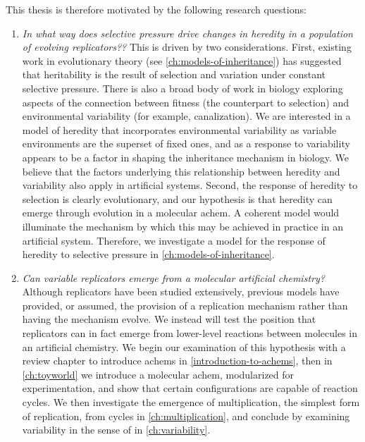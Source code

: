 This thesis is therefore motivated by the following research questions:

\begin{enumerate}[label=RQ\arabic*:]
	
	\item \emph{In what way does selective pressure drive changes in heredity in a population of evolving replicators??} This is driven by two considerations. First, existing work in evolutionary theory (see \cref{ch:models-of-inheritance}) has suggested that heritability is the result of selection and variation under constant selective pressure. There is also a broad body of work in biology exploring aspects of the connection between fitness (the counterpart to selection) and environmental variability (for example, canalization). We are interested in a model of heredity that incorporates environmental variability as variable environments are the superset of fixed ones, and as a response to variability appears to be a factor in shaping the inheritance mechanism in biology. We believe that the factors underlying this relationship between heredity and variability also apply in artificial systems. Second, the response of heredity to selection is clearly evolutionary, and our hypothesis is that heredity can emerge through evolution in a molecular \gls{achem}. A coherent model would illuminate the mechanism by which this may be achieved in practice in an artificial system. Therefore, we investigate a model for the response of heredity to selective pressure in \cref{ch:models-of-inheritance}.
	
	\item \emph{Can variable replicators emerge from a molecular artificial chemistry?} Although replicators have been studied extensively, previous models have provided, or assumed, the provision of a replication mechanism rather than having the mechanism evolve. We instead will test the position that replicators can in fact emerge from lower-level reactions between molecules in an artificial chemistry. We begin our examination of this hypothesis with a review chapter to introduce \glspl{achem} in \cref{introduction-to-achems}, then in \cref{ch:toyworld} we introduce a molecular \gls{achem}, modularized for experimentation, and show that certain configurations are capable of reaction cycles. We then investigate the emergence of multiplication, the simplest form of replication, from cycles in \cref{ch:multiplication}, and conclude by examining variability in the sense of \textcite{Zachar2010} in \cref{ch:variability}.

\end{enumerate}

